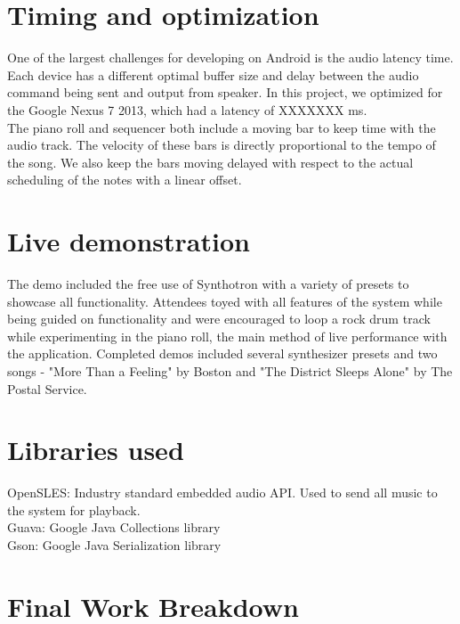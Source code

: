 \documentclass[letterpaper,12pt]{article}
\begin{document}
\section{Timing and optimization}
One of the largest challenges for developing on Android is the audio latency time. Each device has a different optimal buffer size and delay between the audio command being sent and output from speaker. In this project, we optimized for the Google Nexus 7 2013, which had a latency of XXXXXXX ms. \\
The piano roll and sequencer both include a moving bar to keep time with the audio track. The velocity of these bars is directly proportional to the tempo of the song. We also keep the bars moving delayed with respect to the actual scheduling of the notes with a linear offset.

\section{Live demonstration}

The demo included the free use of Synthotron with a variety of presets to showcase all functionality. Attendees toyed with all features of the system while being guided on functionality and were encouraged to loop a rock drum track while experimenting in the piano roll, the main method of live performance with the application. Completed demos included several synthesizer presets and two songs - "More Than a Feeling" by Boston and "The District Sleeps Alone" by The Postal Service.

\section{Libraries used}
\begin{itemize}
OpenSLES: Industry standard embedded audio API. Used to send all music to the system for playback. \cite{opensles}\\
Guava: Google Java Collections library \cite{guava}\\
Gson: Google Java Serialization library \cite{gson}\\
\end{itemize}

\clearpage
\section*{Final Work Breakdown}
\end{document}
